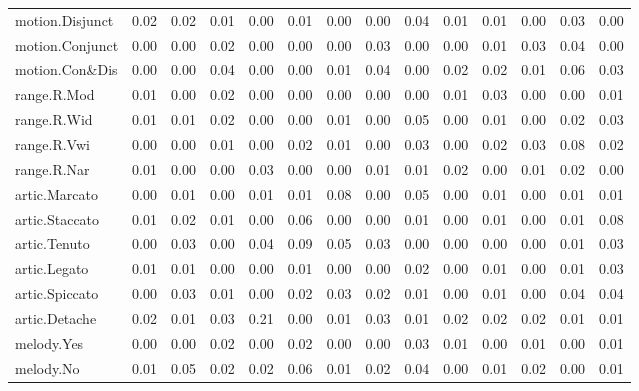 \documentclass[
]{article}
\newenvironment{lltable}{\begin{landscape}\begin{center}\begin{ThreePartTable}}{\end{ThreePartTable}\end{center}\end{landscape}}
\begin{document}
\begin{lltable}
{\begin{longtable}{llllllllllllll}
motion.Disjunct & 0.02 & 0.02 & 0.01 & 0.00 & 0.01 & 0.00 & 0.00 & 0.04 & 0.01 & 0.01 & 0.00 & 0.03 & 0.00\\
motion.Conjunct & 0.00 & 0.00 & 0.02 & 0.00 & 0.00 & 0.00 & 0.03 & 0.00 & 0.00 & 0.01 & 0.03 & 0.04 & 0.00\\
motion.Con\&Dis & 0.00 & 0.00 & 0.04 & 0.00 & 0.00 & 0.01 & 0.04 & 0.00 & 0.02 & 0.02 & 0.01 & 0.06 & 0.03\\
range.R.Mod & 0.01 & 0.00 & 0.02 & 0.00 & 0.00 & 0.00 & 0.00 & 0.00 & 0.01 & 0.03 & 0.00 & 0.00 & 0.01\\
range.R.Wid & 0.01 & 0.01 & 0.02 & 0.00 & 0.00 & 0.01 & 0.00 & 0.05 & 0.00 & 0.01 & 0.00 & 0.02 & 0.03\\
range.R.Vwi & 0.00 & 0.00 & 0.01 & 0.00 & 0.02 & 0.01 & 0.00 & 0.03 & 0.00 & 0.02 & 0.03 & 0.08 & 0.02\\
range.R.Nar & 0.01 & 0.00 & 0.00 & 0.03 & 0.00 & 0.00 & 0.01 & 0.01 & 0.02 & 0.00 & 0.01 & 0.02 & 0.00\\
artic.Marcato & 0.00 & 0.01 & 0.00 & 0.01 & 0.01 & 0.08 & 0.00 & 0.05 & 0.00 & 0.01 & 0.00 & 0.01 & 0.01\\
artic.Staccato & 0.01 & 0.02 & 0.01 & 0.00 & 0.06 & 0.00 & 0.00 & 0.01 & 0.00 & 0.01 & 0.00 & 0.01 & 0.08\\
artic.Tenuto & 0.00 & 0.03 & 0.00 & 0.04 & 0.09 & 0.05 & 0.03 & 0.00 & 0.00 & 0.00 & 0.00 & 0.01 & 0.03\\
artic.Legato & 0.01 & 0.01 & 0.00 & 0.00 & 0.01 & 0.00 & 0.00 & 0.02 & 0.00 & 0.01 & 0.00 & 0.01 & 0.03\\
artic.Spiccato & 0.00 & 0.03 & 0.01 & 0.00 & 0.02 & 0.03 & 0.02 & 0.01 & 0.00 & 0.01 & 0.00 & 0.04 & 0.04\\
artic.Detache & 0.02 & 0.01 & 0.03 & 0.21 & 0.00 & 0.01 & 0.03 & 0.01 & 0.02 & 0.02 & 0.02 & 0.01 & 0.01\\
melody.Yes & 0.00 & 0.00 & 0.02 & 0.00 & 0.02 & 0.00 & 0.00 & 0.03 & 0.01 & 0.00 & 0.01 & 0.00 & 0.01\\
melody.No & 0.01 & 0.05 & 0.02 & 0.02 & 0.06 & 0.01 & 0.02 & 0.04 & 0.00 & 0.01 & 0.02 & 0.00 & 0.01\\
\bottomrule
\end{longtable}

}

\end{lltable}
\end{document}

